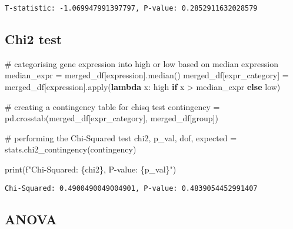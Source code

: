 \documentclass[
  letterpaper,
  DIV=11,
  numbers=noendperiod]{scrartcl}
\newenvironment{Shaded}{\begin{snugshade}}{\end{snugshade}}
\newcommand{\BuiltInTok}[1]{\textcolor[rgb]{0.00,0.23,0.31}{#1}}
\newcommand{\CommentTok}[1]{\textcolor[rgb]{0.37,0.37,0.37}{#1}}
\newcommand{\ControlFlowTok}[1]{\textcolor[rgb]{0.00,0.23,0.31}{\textbf{#1}}}
\newcommand{\KeywordTok}[1]{\textcolor[rgb]{0.00,0.23,0.31}{\textbf{#1}}}
\newcommand{\NormalTok}[1]{\textcolor[rgb]{0.00,0.23,0.31}{#1}}
\newcommand{\OperatorTok}[1]{\textcolor[rgb]{0.37,0.37,0.37}{#1}}
\newcommand{\SpecialCharTok}[1]{\textcolor[rgb]{0.37,0.37,0.37}{#1}}
\newcommand{\SpecialStringTok}[1]{\textcolor[rgb]{0.13,0.47,0.30}{#1}}
\newcommand{\StringTok}[1]{\textcolor[rgb]{0.13,0.47,0.30}{#1}}
\begin{document}
\begin{verbatim}
T-statistic: -1.069947991397797, P-value: 0.2852911632028579
\end{verbatim}

\subsection{Chi2 test}\label{chi2-test}

\begin{Shaded}
\begin{Highlighting}[]
\CommentTok{\# categorising gene expression into \textquotesingle{}high\textquotesingle{} or \textquotesingle{}low\textquotesingle{} based on median expression}
\NormalTok{median\_expr }\OperatorTok{=}\NormalTok{ merged\_df[}\StringTok{\textquotesingle{}expression\textquotesingle{}}\NormalTok{].median()}
\NormalTok{merged\_df[}\StringTok{\textquotesingle{}expr\_category\textquotesingle{}}\NormalTok{] }\OperatorTok{=}\NormalTok{ merged\_df[}\StringTok{\textquotesingle{}expression\textquotesingle{}}\NormalTok{].}\BuiltInTok{apply}\NormalTok{(}\KeywordTok{lambda}\NormalTok{ x: }\StringTok{\textquotesingle{}high\textquotesingle{}} \ControlFlowTok{if}\NormalTok{ x }\OperatorTok{\textgreater{}}\NormalTok{ median\_expr }\ControlFlowTok{else} \StringTok{\textquotesingle{}low\textquotesingle{}}\NormalTok{)}

\CommentTok{\# creating a contingency table for chisq test}
\NormalTok{contingency }\OperatorTok{=}\NormalTok{ pd.crosstab(merged\_df[}\StringTok{\textquotesingle{}expr\_category\textquotesingle{}}\NormalTok{], merged\_df[}\StringTok{\textquotesingle{}group\textquotesingle{}}\NormalTok{])}

\CommentTok{\# performing the Chi{-}Squared test}
\NormalTok{chi2, p\_val, dof, expected }\OperatorTok{=}\NormalTok{ stats.chi2\_contingency(contingency)}

\BuiltInTok{print}\NormalTok{(}\SpecialStringTok{f"Chi{-}Squared: }\SpecialCharTok{\{}\NormalTok{chi2}\SpecialCharTok{\}}\SpecialStringTok{, P{-}value: }\SpecialCharTok{\{}\NormalTok{p\_val}\SpecialCharTok{\}}\SpecialStringTok{"}\NormalTok{)}
\end{Highlighting}
\end{Shaded}

\begin{verbatim}
Chi-Squared: 0.4900490049004901, P-value: 0.4839054452991407
\end{verbatim}

\subsection{ANOVA}\label{anova}
\end{document}
